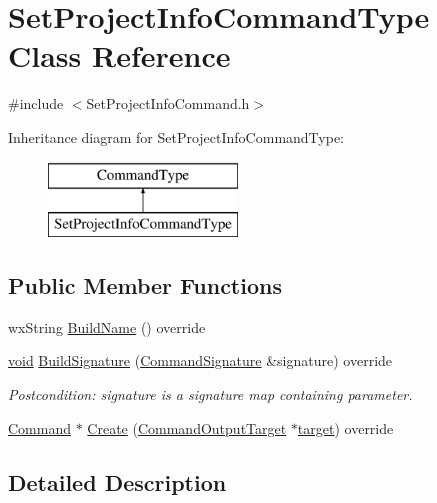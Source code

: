 \hypertarget{class_set_project_info_command_type}{}\section{Set\+Project\+Info\+Command\+Type Class Reference}
\label{class_set_project_info_command_type}


{\ttfamily \#include $<$Set\+Project\+Info\+Command.\+h$>$}

Inheritance diagram for Set\+Project\+Info\+Command\+Type\+:\begin{figure}[H]
\begin{center}
\leavevmode
\includegraphics[height=2.000000cm]{class_set_project_info_command_type}
\end{center}
\end{figure}
\subsection*{Public Member Functions}
\begin{DoxyCompactItemize}
\item 
wx\+String \hyperlink{class_set_project_info_command_type_adc594118155e318ac73afe2aef396d9b}{Build\+Name} () override
\item 
\hyperlink{sound_8c_ae35f5844602719cf66324f4de2a658b3}{void} \hyperlink{class_set_project_info_command_type_a02d83e71e3946f35951e09a8e2f2783d}{Build\+Signature} (\hyperlink{class_command_signature}{Command\+Signature} \&signature) override
\begin{DoxyCompactList}\small\item\em Postcondition\+: signature is a \textquotesingle{}signature\textquotesingle{} map containing parameter. \end{DoxyCompactList}\item 
\hyperlink{class_command}{Command} $\ast$ \hyperlink{class_set_project_info_command_type_a0c90d1a63ece94ff9a31f8a11277b852}{Create} (\hyperlink{class_command_output_target}{Command\+Output\+Target} $\ast$\hyperlink{lib_2expat_8h_a15a257516a87decb971420e718853137}{target}) override
\end{DoxyCompactItemize}


\subsection{Detailed Description}


